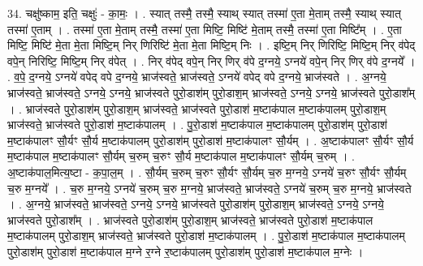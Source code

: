 \documentclass[17pt]{extarticle}
\begin{document}
34. चक्षु॑ष्काम॒ इति॒ चक्षुः॑ - का॒मः॒ । . स्यात् तस्मै॒ तस्मै॒ स्याथ् स्यात् तस्मा॑ ए॒ता मे॒ताम् तस्मै॒ स्याथ् स्यात् तस्मा॑ ए॒ताम् । . तस्मा॑ ए॒ता मे॒ताम् तस्मै॒ तस्मा॑ ए॒ता मिष्टि॒ मिष्टि॑ मे॒ताम् तस्मै॒ तस्मा॑ ए॒ता मिष्टि᳚म् । . ए॒ता मिष्टि॒ मिष्टि॑ मे॒ता मे॒ता मिष्टि॒म् निर् णिरिष्टि॑ मे॒ता मे॒ता मिष्टि॒म् निः । . इष्टि॒म् निर् णिरिष्टि॒ मिष्टि॒म् निर् व॑पेद् वपे॒न् निरिष्टि॒ मिष्टि॒म् निर् व॑पेत् । . निर् व॑पेद् वपे॒न् निर् णिर् व॑पे द॒ग्नये॒ ऽग्नये॑ वपे॒न् निर् णिर् व॑पे द॒ग्नये᳚ । . व॒पे॒ द॒ग्नये॒ ऽग्नये॑ वपेद् वपे द॒ग्नये॒ भ्राज॑स्वते॒ भ्राज॑स्वते॒ ऽग्नये॑ वपेद् वपे द॒ग्नये॒ भ्राज॑स्वते । . अ॒ग्नये॒ भ्राज॑स्वते॒ भ्राज॑स्वते॒ ऽग्नये॒ ऽग्नये॒ भ्राज॑स्वते पुरो॒डाश॑म् पुरो॒डाश॒म् भ्राज॑स्वते॒ ऽग्नये॒ ऽग्नये॒ भ्राज॑स्वते पुरो॒डाश᳚म् । . भ्राज॑स्वते पुरो॒डाश॑म् पुरो॒डाश॒म् भ्राज॑स्वते॒ भ्राज॑स्वते पुरो॒डाश॑ म॒ष्टाक॑पाल म॒ष्टाक॑पालम् पुरो॒डाश॒म् भ्राज॑स्वते॒ भ्राज॑स्वते पुरो॒डाश॑ म॒ष्टाक॑पालम् । . पु॒रो॒डाश॑ म॒ष्टाक॑पाल म॒ष्टाक॑पालम् पुरो॒डाश॑म् पुरो॒डाश॑ म॒ष्टाक॑पालꣳ सौ॒र्यꣳ सौ॒र्य म॒ष्टाक॑पालम् पुरो॒डाश॑म् पुरो॒डाश॑ म॒ष्टाक॑पालꣳ सौ॒र्यम् । . अ॒ष्टाक॑पालꣳ सौ॒र्यꣳ सौ॒र्य म॒ष्टाक॑पाल म॒ष्टाक॑पालꣳ सौ॒र्यम् च॒रुम् च॒रुꣳ सौ॒र्य म॒ष्टाक॑पाल म॒ष्टाक॑पालꣳ सौ॒र्यम् च॒रुम् । . अ॒ष्टाक॑पाल॒मित्य॒ष्टा - क॒पा॒ल॒म् । . सौ॒र्यम् च॒रुम् च॒रुꣳ सौ॒र्यꣳ सौ॒र्यम् च॒रु म॒ग्नये॒ ऽग्नये॑ च॒रुꣳ सौ॒र्यꣳ सौ॒र्यम् च॒रु म॒ग्नये᳚ । . च॒रु म॒ग्नये॒ ऽग्नये॑ च॒रुम् च॒रु म॒ग्नये॒ भ्राज॑स्वते॒ भ्राज॑स्वते॒ ऽग्नये॑ च॒रुम् च॒रु म॒ग्नये॒ भ्राज॑स्वते । . अ॒ग्नये॒ भ्राज॑स्वते॒ भ्राज॑स्वते॒ ऽग्नये॒ ऽग्नये॒ भ्राज॑स्वते पुरो॒डाश॑म् पुरो॒डाश॒म् भ्राज॑स्वते॒ ऽग्नये॒ ऽग्नये॒ भ्राज॑स्वते पुरो॒डाश᳚म् । . भ्राज॑स्वते पुरो॒डाश॑म् पुरो॒डाश॒म् भ्राज॑स्वते॒ भ्राज॑स्वते पुरो॒डाश॑ म॒ष्टाक॑पाल म॒ष्टाक॑पालम् पुरो॒डाश॒म् भ्राज॑स्वते॒ भ्राज॑स्वते पुरो॒डाश॑ म॒ष्टाक॑पालम् । . पु॒रो॒डाश॑ म॒ष्टाक॑पाल म॒ष्टाक॑पालम् पुरो॒डाश॑म् पुरो॒डाश॑ म॒ष्टाक॑पाल म॒ग्ने र॒ग्ने र॒ष्टाक॑पालम् पुरो॒डाश॑म् पुरो॒डाश॑ म॒ष्टाक॑पाल म॒ग्नेः । \newline
\end{document}
